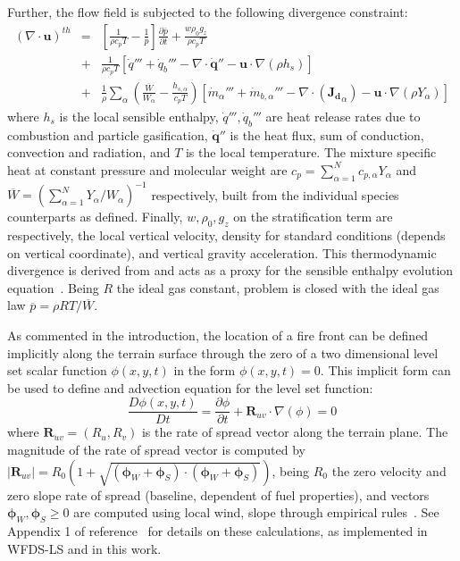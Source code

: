 \documentclass[journal,article,atmosphere,submit,moreauthors,pdftex]{Definitions/mdpi}
\begin{document}
Further, the flow field is subjected to the following divergence constraint:
%
\begin{eqnarray}
    ( \nabla \cdot \mathbf{u} )^{th} &=& 
    \left[ \frac{1}{\rho c_p T} - \frac{1}{\bar{p}} \right] 
    \frac{\partial \bar{p}}{\partial t} + \frac{w \rho_0 g_z}{\rho c_p T} \nonumber \\
    &+& \frac{1}{\rho c_p T} \left[ \dot{q}''' + \dot{q}_b''' - \nabla \cdot \dot{\mathbf{q}}'' - \mathbf{u} \cdot \nabla (\rho h_s) \right] \nonumber \\
    &+& \frac{1}{\rho} \sum_\alpha \left( \frac{\overline{W}}{W_\alpha} - \frac{h_{s,\alpha}}{c_p T} \right) \left[ \dot{m}_\alpha'''  + \dot{m}_{b,\alpha}''' - \nabla \cdot (\mathbf{J_{d}}_\alpha) - \mathbf{u} \cdot \nabla (\rho Y_\alpha) \right] \label{eq:divth}
\end{eqnarray}
%
where $h_s$ is the local sensible enthalpy, $\dot{q}''', \dot{q}_b'''$ are heat release rates due to combustion and particle gasification, $\dot{\mathbf{q}}''$ is the heat flux, sum of conduction, convection and radiation, and $T$ is the local temperature. The mixture specific heat at constant pressure and molecular weight are $c_p=\sum_{\alpha =1}^N{c_{p,\alpha} Y_\alpha}$ and $\overline{W}=\left(\sum_{\alpha =1}^N{Y_\alpha /W_\alpha} \right)^{-1}$ respectively, built from the individual species counterparts as defined. Finally, $w,\rho_0,g_z$ on the stratification term are respectively, the local vertical velocity, density for standard conditions (depends on vertical coordinate), and vertical gravity acceleration. This thermodynamic divergence is derived from and acts as a proxy for the sensible enthalpy evolution equation~\cite{mcdermo_2014}. Being $R$ the ideal gas constant, problem is closed with the ideal gas law $ \overline{p} = {\rho R T}/{\overline{W}}$.

As commented in the introduction, the location of a fire front can be defined implicitly along the terrain surface through the zero of a two dimensional level set scalar function $\phi(x,y,t)$ in the form $\phi(x,y,t)=0$. This implicit form can be used to define and advection equation for the level set function:
%
\begin{equation}
   \frac{D \phi(x,y,t)}{D t} =  \frac{\partial \phi}{\partial t} + \mathbf{R}_{uv} \cdot \nabla (\phi) = 0 \label{eqn:lset}
\end{equation}
%
where $\mathbf{R}_{uv}=(R_u,R_v)$ is the rate of spread vector along the terrain plane. The magnitude of the rate of spread vector is computed by $|\mathbf{R}_{uv}|=R_0 \left(1 + \sqrt{(\boldsymbol{\phi}_W+\boldsymbol{\phi}_S) \cdot (\boldsymbol{\phi}_W+\boldsymbol{\phi}_S) } \right)$, being $R_0$ the zero velocity and zero slope rate of spread (baseline, dependent of fuel properties), and vectors $\boldsymbol{\phi}_W,\boldsymbol{\phi}_S \ge 0$ are computed using local wind, slope through empirical rules~\cite{Wilson:1980}. See Appendix 1 of reference~\cite{Bova:IJWF2015} for details on these calculations, as implemented in WFDS-LS and in this work.  
\end{document}
